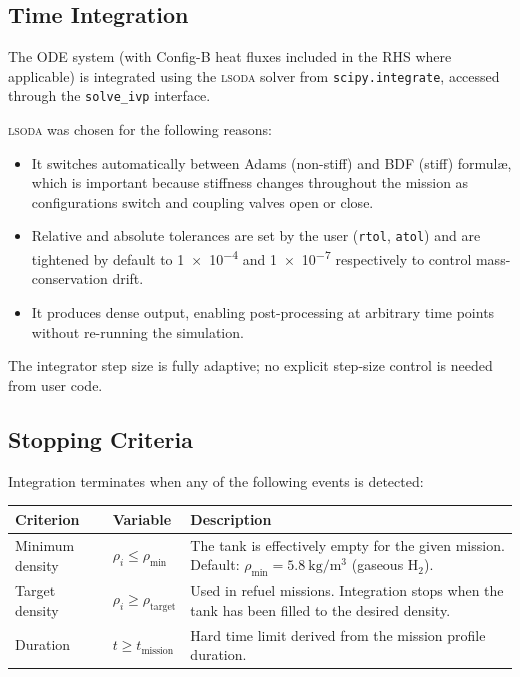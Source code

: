 \subsection{Time Integration}
\label{sec:method:integration}

The ODE system (with Config-B heat fluxes included in the RHS where applicable)
is integrated using the \textsc{lsoda} solver from \texttt{scipy.integrate},
accessed through the \texttt{solve\_ivp} interface.

\textsc{lsoda} was chosen for the following reasons:

\begin{itemize}[nosep, left=0pt]
  \item It switches automatically between Adams (non-stiff) and BDF (stiff)
        formulæ, which is important because stiffness changes throughout the
        mission as configurations switch and coupling valves open or close.
  \item Relative and absolute tolerances are set by the user (\texttt{rtol},
        \texttt{atol}) and are tightened by default to \num{1e-4} and
        \num{1e-7} respectively to control mass-conservation drift.
  \item It produces dense output, enabling post-processing at arbitrary time
        points without re-running the simulation.
\end{itemize}

The integrator step size is fully adaptive; no explicit step-size control is
needed from user code.

\subsection{Stopping Criteria}
\label{sec:method:stopping}

Integration terminates when any of the following events is detected:

\begin{center}
\begin{tabularx}{\linewidth}{@{} l l X @{}}
\toprule
\textbf{Criterion} & \textbf{Variable} & \textbf{Description} \\
\midrule
Minimum density  & $\rho_i \le \rho_{\min}$ &
  The tank is effectively empty for the given mission.
  Default: $\rho_{\min} = \SI{5.8}{\kilogram\per\cubic\metre}$ (gaseous H$_2$). \\[4pt]
Target density   & $\rho_i \ge \rho_{\text{target}}$ &
  Used in refuel missions.  Integration stops when the tank has been filled
  to the desired density. \\[4pt]
Duration         & $t \ge t_{\text{mission}}$ &
  Hard time limit derived from the mission profile duration. \\
\bottomrule
\end{tabularx}
\end{center}

